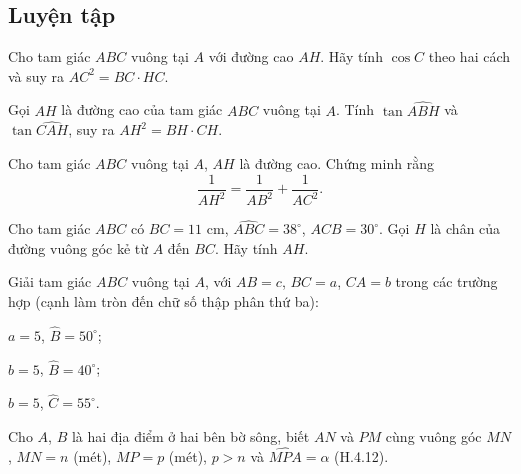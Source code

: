 \begin{practice}
    \subsection{Luyện tập}

    \begin{questions}[resume=SBT]
        \item Cho tam giác $ABC$ vuông tại $A$ với đường cao $AH$. Hãy tính $\cos C$ theo hai cách và suy ra $AC^2=BC\cdot HC$.

        \answerline
        \answerline
        \answerline

        \item Gọi $AH$ là đường cao của tam giác $ABC$ vuông tại $A$. Tính $\tan\widehat{ABH}$ và $\tan\widehat{CAH}$, suy ra $AH^2=BH\cdot CH$.

        \answerline
        \answerline
        \answerline

        \item Cho tam giác $ABC$ vuông tại $A$, $AH$ là đường cao. Chứng minh rằng
        \[
            \dfrac{1}{AH^2}=\dfrac{1}{AB^2}+\dfrac{1}{AC^2}.
        \]

        \answerline
        \answerline
        \answerline

        \item Cho tam giác $ABC$ có $BC=11$ cm, $\widehat{ABC}=38^\circ$, $\widehat{ACB}=30^\circ$. Gọi $H$ là chân của đường vuông góc kẻ từ $A$ đến $BC$. Hãy tính $AH$.

        \answerline
        \answerline
        \answerline

        \item Giải tam giác $ABC$ vuông tại $A$, với $AB=c$, $BC=a$, $CA=b$ trong các trường hợp (cạnh làm tròn đến chữ số thập phân thứ ba):
        \begin{questions}
            \item $a=5$, $\widehat{B}=50^\circ$;

            \answerline
            \answerline
            \item $b=5$, $\widehat{B}=40^\circ$;

            \answerline
            \answerline
            \item $b=5$, $\widehat{C}=55^\circ$.

            \answerline
            \answerline
        \end{questions}

        \item Cho $A$, $B$ là hai địa điểm ở hai bên bờ sông, biết $AN$ và $PM$ cùng vuông góc $MN$, $MN=n$ (mét), $MP=p$ (mét), $p>n$ và $\widehat{MPA}=\alpha$ (H.4.12).


\end{questions}
\end{practice}
